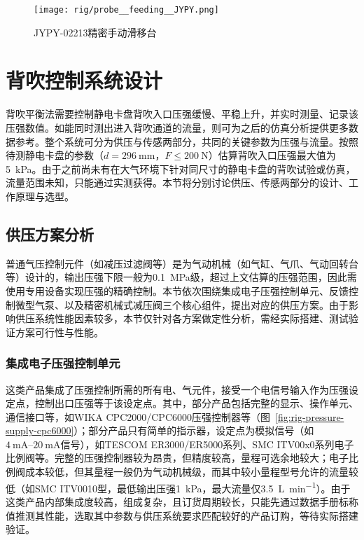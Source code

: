 \begin{figure}[tbh]
\centering
\texttt{[image: rig/probe\_\_feeding\_\_JYPY.png]}
\caption{JYPY-02213精密手动滑移台}
\label{fig:rig-probe-feeding-JYPY}
\end{figure}



\clearpage



\section{背吹控制系统设计}\label{sec:rig-pressure}

背吹平衡法需要控制静电卡盘背吹入口压强缓慢、平稳上升，并实时测量、记录该压强数值。如能同时测出进入背吹通道的流量，则可为之后的仿真分析提供更多数据参考。整个系统可分为供压与传感两部分，共同的关键参数为压强与流量。按照待测静电卡盘的参数（$d = \SI{296}{\milli\meter}$，$F \leq \SI{200}{\newton}$）估算背吹入口压强最大值为\SI{5}{\kilo\pascal}\footnotemark{}。由于之前尚未有在大气环境下针对同尺寸的静电卡盘的背吹试验或仿真，流量范围未知，只能通过实测获得。本节将分别讨论供压、传感两部分的设计、工作原理与选型。



\subsection{供压方案分析}\label{sec:rig-pressure-supply}

普通气压控制元件（如减压过滤阀等）是为气动机械（如气缸、气爪、气动回转台等）设计的，输出压强下限一般为\SI{0.1}{\mega\pascal}级，超过上文估算的压强范围，因此需使用专用设备实现压强的精确控制。本节依次围绕集成电子压强控制单元、反馈控制微型气泵、以及精密机械式减压阀三个核心组件，提出对应的供压方案。由于影响供压系统性能因素较多，本节仅针对各方案做定性分析，需经实际搭建、测试验证方案可行性与性能。

\subsubsection{集成电子压强控制单元}\label{sec:rig-pressure-supply-integrated}

这类产品集成了压强控制所需的所有电、气元件，接受一个电信号输入作为压强设定点，控制出口压强等于该设定点。其中，部分产品包括完整的显示、操作单元、通信接口等，如WIKA CPC2000/CPC6000压强控制器等（图~\ref{fig:rig-pressure-supply-cpc6000}）；部分产品只有简单的指示器，设定点为模拟信号（如$\SIrange{4}{20}{\milli\ampere}$信号），如TESCOM ER3000/ER5000系列、SMC ITV00x0系列电子比例阀等。完整的压强控制器较为昂贵，但精度较高，量程可选余地较大；电子比例阀成本较低，但其量程一般仍为气动机械级，而其中较小量程型号允许的流量较低（如SMC ITV0010型，最低输出压强\SI{1}{\kilo\pascal}，最大流量仅\SI{3.5}{\liter\per\minute}）。由于这类产品内部集成度较高，组成复杂，且订货周期较长，只能先通过数据手册标称值推测其性能，选取其中参数与供压系统要求匹配较好的产品订购，等待实际搭建验证。

